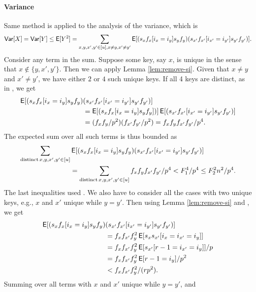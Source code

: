 \paragraph{Variance}
Same method is applied to the analysis of the variance, which is
\[{\sf Var}[X]={\sf Var}[Y]\leq \operatorname*{\sf{E}}[Y^2]=
   \sum_{x,y,x',y'\in[u],x\neq y,x'\neq y'}\operatorname*{\sf{E}}[(s_x f_x[i_x=i_y]s_y f_y)
(s_{x'}f_{x'}[i_{x'}=i_{y'}]s_{y'} f_{y'})].\] 
Consider any term in the
sum. Suppose some key, say $x$, is unique in the sense that
$x\not\in\{y,x',y'\}$. Then we can apply Lemma \ref{lem:remove-si}.
Given that $x\neq y$
and $x'\neq y'$, we have either $2$ or $4$ such unique keys. If all
4 keys are distinct, as in , we get
\begin{align*}
   \operatorname*{\sf{E}}[(s_x f_x[i_x=i_y]s_y f_y)&
   (s_{x'}f_{x'}[i_{x'}=i_{y'}]s_{y'} f_{y'})]\\
                               &=\operatorname*{\sf{E}}[(s_x f_x[i_x=i_y]s_y f_y])]\operatorname*{\sf{E}}[(s_{x'}f_{x'}[i_{x'}=i_{y'}]s_{y'} f_{y'})]\\
                               &=(f_x f_y/p^2)(f_{x'} f_{y'}/p^2)=f_x f_yf_{x'} f_{y'}/p^4.
\end{align*}
The expected sum over all such terms is thus bounded
as 
\begin{align}
   \sum_{{\rm distinct}\, x,y,x',y'\in[u]}&
   \operatorname*{\sf{E}}[(s_x f_x[i_x=i_y]s_y f_y)
   (s_{x'}f_{x'}[i_{x'}=i_{y'}]s_{y'} f_{y'})]\nonumber\\
                                          &=\sum_{{\rm distinct}\,x,y,x',y'\in[u]}
                                          f_xf_yf_{x'}f_{y'}/p^4<F_1^4/p^4\leq F_2^2 n^2/p^4.\label{eq:distinct}
\end{align}
The last inequalities 
used . We also have to consider all the cases with two unique keys, e.g., $x$ 
and $x'$ unique while $y=y'$. Then using Lemma \ref{lem:remove-si} and , we get
\begin{align*}
   \operatorname*{\sf{E}}[(s_x f_x[i_x=i_y]s_y f_y)&(s_{x'}f_{x'}[i_{x'}=i_{y'}]s_{y'} f_{y'})]\\
                               &=f_xf_{x'}f_y^2\operatorname*{\sf{E}}[s_xs_{x'} [i_x=i_{x'}=i_y]]\\
                               &=f_xf_{x'}f_y^2\operatorname*{\sf{E}}[s_{x'} [r-1=i_{x'}=i_y]]/p\\
                               &=f_xf_{x'}f_y^2\operatorname*{\sf{E}}[r-1=i_y]/p^2\\
                               &<f_xf_{x'}f_y^2/(rp^2).
\end{align*}    
Summing over all terms with $x$ and $x'$ unique while $y=y'$, and
